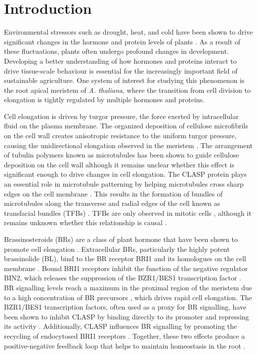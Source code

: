 \documentclass[referee,pdflatex,sn-mathphys-num]{sn-jnl}
\begin{document}
\section{Introduction}\label{sec1}

Environmental stressors such as drought, heat, and cold have been shown to drive significant changes in the hormone and protein levels of plants \cite{halat2020}.
As a result of these fluctuations, plants often undergo profound changes in development.
Developing a better understanding of how hormones and proteins interact to drive tissue-scale behaviour is essential for the increasingly important field of sustainable agriculture.
One system of interest for studying this phenomenon is the root apical meristem of \emph{A. thaliana}, where the transition from cell division to elongation is tightly regulated by multiple hormones and proteins.

Cell elongation is driven by turgor pressure, the force exerted by intracellular fluid on the plasma membrane.
The organized deposition of cellulose microfibrils on the cell wall creates anisotropic resistance to the uniform turgor pressure, causing the unidirectional elongation observed in the meristem \cite{hamant2010}.
The arrangement of tubulin polymers known as microtubules has been shown to guide cellulose deposition on the cell wall \cite{hamant2010} although it remains unclear whether this effect is significant enough to drive changes in cell elongation.
The CLASP protein plays an essential role in microtubule patterning by helping microtubules cross sharp edges on the cell membrane \cite{ambrose2011}.
This results in the formation of bundles of microtubules along the transverse and radial edges of the cell known as transfacial bundles (TFBs) \cite{halat2022}.
TFBs are only observed in mitotic cells \cite{ambrose2011}, although it remains unknown whether this relationship is causal \cite{halat2022}. 

Brassinosteroids (BRs) are a class of plant hormone that have been shown to promote cell elongation \cite{ackerman-lavert2020}.
Extracellular BRs, particularly the highly potent brassinolide (BL), bind to the BR receptor BRI1 and its homologues on the cell membrane \cite{vukasinovic2021}.
Bound BRI1 receptors inhibit the function of the negative regulator BIN2, which releases the suppression of the BZR1/BES1 transcription factor \cite{ackerman-lavert2020}.
BR signalling levels reach a maximum in the proximal region of the meristem due to a high concentration of BR precursors \cite{vukasinovic2021}, which drives rapid cell elongation.
The BZR1/BES1 transcription factors, often used as a proxy for BR signalling, have been shown to inhibit CLASP by binding directly to its promoter and repressing its activity \cite{ruan2018}.
Additionally, CLASP influences BR signalling by promoting the recycling of endocytosed BRI1 receptors \cite{ruan2018}.
Together, these two effects produce a positive-negative feedback loop that helps to maintain homeostasis in the root \cite{ruan2018}.
\end{document}
